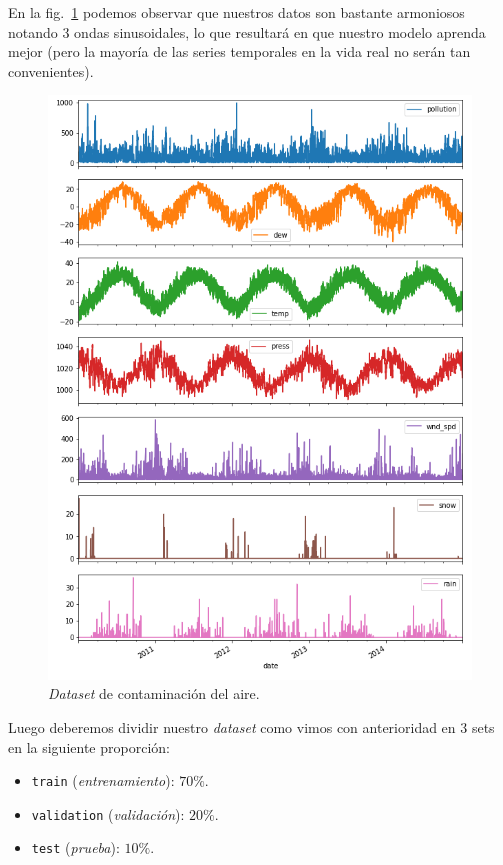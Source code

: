 \documentclass[a4paper,12pt]{article}
\begin{document}
En la fig.~\ref{fig:pollution_dataset} podemos observar que nuestros datos son bastante armoniosos notando 3 ondas sinusoidales, lo que resultará en que nuestro modelo aprenda mejor (pero la mayoría de las series temporales en la vida real no serán tan convenientes).

\begin{figure}[H]
	\begin{center}
	\includegraphics[width=1\textwidth]{pollution.png}
  	\caption{\textit{Dataset} de contaminación del aire.}
  	\label{fig:pollution_dataset}
  	\end{center}
\end{figure}

Luego deberemos dividir nuestro \textit{dataset} como vimos con anterioridad en 3 sets en la siguiente proporción:
\begin{itemize}
	\item \texttt{train} (\textit{entrenamiento}): $70\%$.
	\item \texttt{validation} (\textit{validación}): $20\%$.
	\item \texttt{test} (\textit{prueba}): $10\%$.
\end{itemize}
\end{document}
